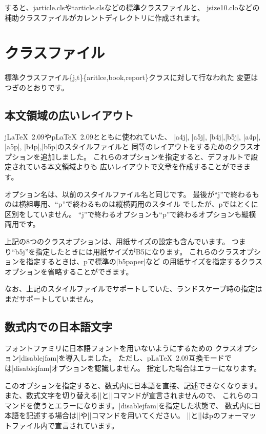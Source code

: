 \documentclass{plnews}
\begin{document}
すると、jarticle.clsやtarticle.clsなどの標準クラスファイルと、
jsize10.cloなどの補助クラスファイルがカレントディレクトリに作成されます。


\section{クラスファイル}
標準クラスファイル\{j,t\}\{aritlce,book,report\}クラスに対して行なわれた
変更はつぎのとおりです。

\subsection{本文領域の広いレイアウト}
j\LaTeX~2.09やp\LaTeX~2.09とともに使われていた、
|a4j|, |a5j|, |b4j|,|b5j|, |a4p|, |a5p|, |b4p|,|b5p|のスタイルファイルと
同等のレイアウトをするためのクラスオプションを追加しました。
これらのオプションを指定すると、デフォルトで設定されている本文領域よりも
広いレイアウトで文章を作成することができます。

オプション名は、以前のスタイルファイル名と同じです。
最後が``j''で終わるものは横組専用、``p''で終わるものは縦横両用のスタイル
でしたが、p\LaTeXe{}ではとくに区別をしていません。
``j''で終わるオプションも``p''で終わるオプションも縦横両用です。

上記の8つのクラスオプションは、用紙サイズの設定も含んでいます。
つまり``b5j''を指定したときには用紙サイズがB5になります。
これらのクラスオプションを指定するときは、p\LaTeXe{}で標準の|b5paper|など
の用紙サイズを指定するクラスオプションを省略することができます。

なお、上記のスタイルファイルでサポートしていた、ランドスケープ時の指定は
まだサポートしていません。

\subsection{数式内での日本語文字}
フォントファミリに日本語フォントを用いないようにするための
クラスオプション|disablejfam|を導入しました。
ただし、p\LaTeX~2.09互換モードでは|disablejfam|オプションを認識しません。
指定した場合はエラーになります。

このオプションを指定すると、数式内に日本語を直接、記述できなくなります。
また、数式文字を切り替える|\mathmc|と|\mathgt|コマンドが宣言されませんので、
これらのコマンドを使うとエラーになります。|disablejfam|を指定した状態で、
数式内に日本語を記述する場合は|\textmc|や|\textgt|コマンドを用いてください。
|\textmc|と|\textgt|はp\LaTeXe{}のフォーマットファイル内で宣言されています。
\end{document}
